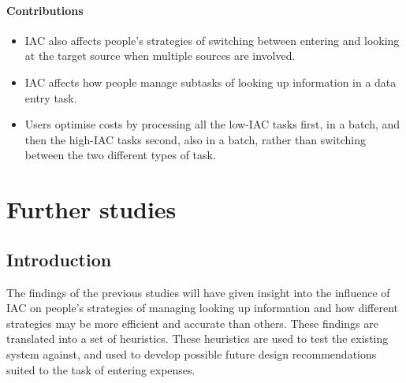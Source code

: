 \documentclass[11pt,oneside]{report}
\begin{document}
\begin{table}
\begin{itemize}
\end{itemize}

\subsubsection{Contributions}
\begin{itemize}
\item   
IAC also affects people's strategies of switching between entering and looking at the target source when multiple sources are involved.
\item
IAC affects how people manage subtasks of looking up information in a data entry task.
\item
Users optimise costs by processing all the low-IAC tasks first, in a batch, and then the high-IAC tasks second, also in a batch, rather than switching between the two different types of task.  
\end{itemize}

\chapter{Further studies}

\section{Introduction}

The findings of the previous studies will have given insight into the influence of IAC on people's strategies of managing looking up information and how different strategies may be more efficient and accurate than others. These findings are translated into a set of heuristics. These heuristics are used to test the existing system against, and used to develop possible future design recommendations suited to the task of entering expenses. 


\end{table}
\end{document}
